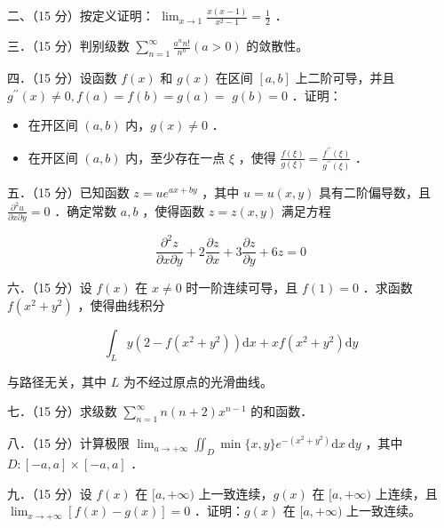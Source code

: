 \documentclass{article}
\begin{document}
二、（15 分）按定义证明： \(\lim _{x \rightarrow 1} \frac{x(x-1)}{x^{2}-1}=\frac{1}{2}\) ．

三．（15 分）判别级数 \(\sum_{n=1}^{\infty} \frac{a^{n} n!}{n^{n}}(a>0)\) 的敛散性。

四．（15 分）设函数 \(f(x)\) 和 \(g(x)\) 在区间 \([a, b]\) 上二阶可导，并且 \(g^{\prime \prime}(x) \neq 0, f(a)=f(b)=g(a)=\) \(g(b)=0\) ．证明：

\begin{itemize}
  \item[（1）] 在开区间 \((a, b)\) 内，\(g(x) \neq 0\) ．
  \item[（2）] 在开区间 \((a, b)\) 内，至少存在一点 \(\xi\) ，使得 \(\frac{f(\xi)}{g(\xi)}=\frac{f^{\prime \prime}(\xi)}{g^{\prime \prime}(\xi)}\) ．
\end{itemize}

五．（15 分）已知函数 \(z=u e^{a x+b y}\) ，其中 \(u=u(x, y)\) 具有二阶偏导数，且 \(\frac{\partial^{2} u}{\partial x \partial y}=0\) ．确定常数 \(a, b\) ，使得函数 \(z=z(x, y)\) 满足方程

\[
\frac{\partial^{2} z}{\partial x \partial y}+2 \frac{\partial z}{\partial x}+3 \frac{\partial z}{\partial y}+6 z=0
\]

六．（15 分）设 \(f(x)\) 在 \(x \neq 0\) 时一阶连续可导，且 \(f(1)=0\) ．求函数 \(f\left(x^{2}+y^{2}\right)\) ，使得曲线积分

\[
\int_{L} y\left(2-f\left(x^{2}+y^{2}\right)\right) \mathrm{d} x+x f\left(x^{2}+y^{2}\right) \mathrm{d} y
\]

与路径无关，其中 \(L\) 为不经过原点的光滑曲线。

七．（15 分）求级数 \(\sum_{n=1}^{\infty} n(n+2) x^{n-1}\) 的和函数．

八．（15 分）计算极限 \(\lim _{a \rightarrow+\infty} \iint_{D} \min \{x, y\} e^{-\left(x^{2}+y^{2}\right)} \mathrm{d} x \mathrm{~d} y\) ，其中 \(D:[-a, a] \times[-a, a]\) ．

九．（15 分）设 \(f(x)\) 在 \([a,+\infty)\) 上一致连续，\(g(x)\) 在 \([a,+\infty)\) 上连续，且 \(\lim _{x \rightarrow+\infty}[f(x)-g(x)]=0\) ．证明：\(g(x)\) 在 \([a,+\infty)\) 上一致连续。
\end{document}
